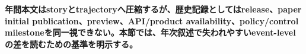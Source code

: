 \noindent\textbf{年間本文はstoryとtrajectoryへ圧縮するが、歴史記録としてはrelease、paper initial publication、preview、API/product availability、policy/control milestoneを同一視できない。本節では、年次叙述で失われやすいevent-levelの差を読むための基準を明示する。}
